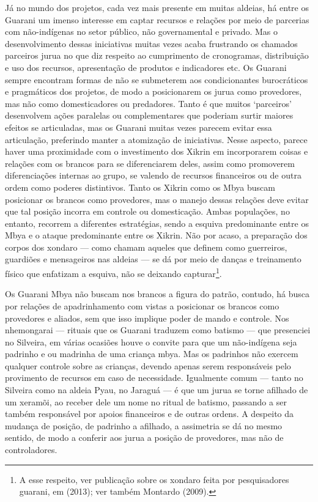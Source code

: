 Já no mundo dos projetos, cada vez mais presente em muitas aldeias, há
entre os Guarani um imenso interesse em captar recursos e relações por
meio de parcerias com não-indígenas no setor público, não governamental
e privado. Mas o desenvolvimento dessas iniciativas muitas vezes acaba
frustrando os chamados parceiros jurua no que diz respeito ao
cumprimento de cronogramas, distribuição e uso dos recursos,
apresentação de produtos e indicadores etc. Os Guarani sempre encontram
formas de não se submeterem aos condicionantes burocráticos e
pragmáticos dos projetos, de modo a posicionarem os jurua como
provedores, mas não como domesticadores ou predadores. Tanto é que
muitos ‘parceiros’ desenvolvem ações paralelas ou complementares que
poderiam surtir maiores efeitos se articuladas, mas os Guarani muitas
vezes parecem evitar essa articulação, preferindo manter a atomização
de iniciativas. Nesse aspecto, parece haver uma proximidade com o
investimento dos Xikrin em incorporarem coisas e relações com os
brancos para se diferenciarem deles, assim como promoverem
diferenciações internas ao grupo, se valendo de recursos financeiros ou
de outra ordem como poderes distintivos. Tanto os Xikrin como os Mbya
buscam posicionar os brancos como provedores, mas o manejo dessas
relações deve evitar que tal posição incorra em controle ou
domesticação. Ambas populações, no entanto, recorrem a diferentes
estratégias, sendo a esquiva predominante entre os Mbya e o ataque
predominante entre os Xikrin. Não por acaso, a preparação dos corpos
dos xondaro — como chamam aqueles que definem como guerreiros,
guardiões e mensageiros nas aldeias — se dá por meio de danças e
treinamento físico que enfatizam a esquiva, não se deixando
capturar\footnote{A esse respeito, ver publicação sobre os xondaro
feita por pesquisadores guarani, em  (2013); ver também Montardo
(2009).}.

Os Guarani Mbya não buscam nos brancos a figura do patrão, contudo, há
busca por relações de apadrinhamento com vistas a posicionar os brancos
como provedores e aliados, sem que isso implique poder de mando e
controle. Nos nhemongarai — rituais que os Guarani traduzem como
batismo — que presenciei no Silveira, em várias ocasiões houve o
convite para que um não-indígena seja padrinho e ou madrinha de uma
criança mbya. Mas os padrinhos não exercem qualquer controle sobre as
crianças, devendo apenas serem responsáveis pelo provimento de recursos
em caso de necessidade. Igualmente comum — tanto no Silveira como na
aldeia Pyau, no Jaraguá — é que um jurua se torne afilhado de um
xeramõi, ao receber dele um nome no ritual de batismo, passando a ser
também responsável por apoios financeiros e de outras ordens. A
despeito da mudança de posição, de padrinho a afilhado, a assimetria se
dá no mesmo sentido, de modo a conferir aos jurua a posição de
provedores, mas não de controladores.

